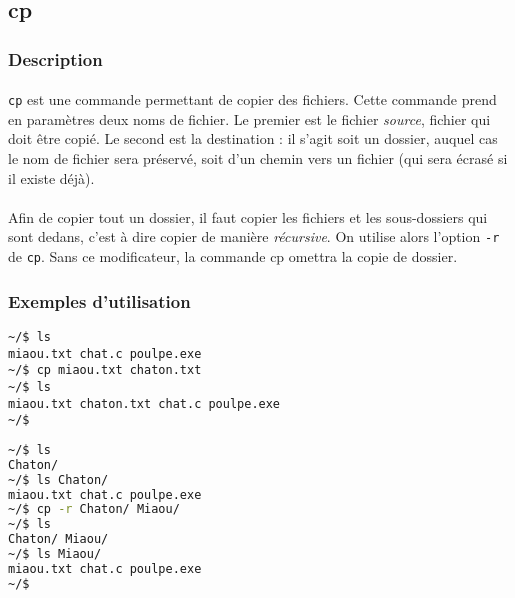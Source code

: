 \subsection{cp}

\subsubsection*{Description}

\paragraph{} \texttt{cp} est une commande permettant de copier des fichiers.
Cette commande prend en paramètres deux noms de fichier. Le premier est le
fichier \emph{source}, fichier qui doit être copié. Le second est la
destination : il s'agit soit un dossier, auquel cas le nom de fichier sera
préservé, soit d'un chemin vers un fichier (qui sera écrasé si il existe
déjà).

\paragraph{} Afin de copier tout un dossier, il faut copier les fichiers et les
sous-dossiers qui sont dedans, c'est à dire copier de manière \emph{récursive}.
On utilise alors l'option \texttt{-r} de \texttt{cp}. Sans ce modificateur, la
commande cp omettra la copie de dossier.

\subsubsection*{Exemples d'utilisation}

\begin{lstlisting}[caption=copie de fichier]
~/$ ls
miaou.txt chat.c poulpe.exe
~/$ cp miaou.txt chaton.txt
~/$ ls
miaou.txt chaton.txt chat.c poulpe.exe
~/$
\end{lstlisting}

\begin{lstlisting}[language=bash,caption=copie de dossier]
~/$ ls
Chaton/
~/$ ls Chaton/
miaou.txt chat.c poulpe.exe
~/$ cp -r Chaton/ Miaou/
~/$ ls
Chaton/ Miaou/
~/$ ls Miaou/
miaou.txt chat.c poulpe.exe
~/$
\end{lstlisting}
